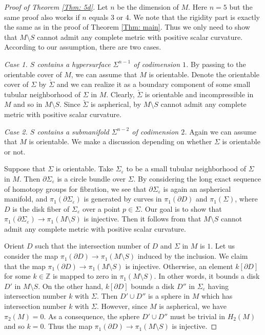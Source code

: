 \documentclass[11pt, reqno]{amsart}
\numberwithin{equation}{section}
\theoremstyle{definition}
\newcommand{\ve}{\varepsilon}
\begin{document}
\begin{proof}[Proof of Theorem \ref{Thm: 5d}]
Let $n$ be the dimension of $M$. Here $n =5$ but the same proof also works if $n$ equals 3 or 4. We note that the rigidity part is exactly the same as in the proof of Theorem \ref{Thm: main}. Thus we only need to show that $M\setminus S$ cannot admit any complete metric with positive scalar curvature. According to our assumption, there are two cases.

\medskip

{\it Case 1. $S$ contains a hypersurface $\Sigma^{n-1}$ of codimension $1$.}
By passing to the orientable cover of $M$, we can assume that $M$ is orientable. Denote the orientable cover of $\Sigma$ by $\check \Sigma$ and we can realize it as a boundary component of some small tubular neighborhood of $\Sigma$ in $M$. Clearly, $\check \Sigma$ is orientable and incompressible in $M$ and so in $M\setminus S$.
Since $\check\Sigma$ is aspherical, by \cite[Theorem 1.1]{CLSZ21} $M \setminus S$ cannot admit any complete metric with positive scalar curvature.

\medskip

{\it Case 2. $S$ contains a submanifold $\Sigma^{n-2}$ of codimension $2$.} Again we can assume that $M$ is orientable. We make a discussion depending on whether $\Sigma$ is orientable or not.

Suppose that $\Sigma$ is orientable.
Take $\Sigma_\ve$ to be a small tubular neighborhood of $\Sigma$ in $M$. Then $\partial \Sigma_\ve$ is a circle bundle over $\Sigma$. By considering the long exact sequence of homotopy groups for fibration, we see that $\partial \Sigma_\ve$ is again an aspherical manifold, and $\pi_1(\partial \Sigma_\ve)$ is generated by curves in $\pi_1(\partial D)$ and $\pi_1(\Sigma)$, where $D$ is the disk fiber of $\Sigma_\ve$ over a point $p \in \Sigma$.
Our goal is to show that $\pi_1(\partial \Sigma_\ve) \to \pi_1(M\setminus S)$ is injective.  Then it follows from \cite[Theorem 1.1]{CLSZ21} that $M \setminus S$ cannot admit any complete metric with positive scalar curvature.


Orient $D$ such that the intersection number of $D$ and $\Sigma$ in $M$ is $1$. Let us consider the map $\pi_1(\partial D) \to \pi_1(M\setminus S)$ induced by the inclusion. We claim that the map $\pi_1(\partial D) \to \pi_1(M\setminus S)$ is injective. Otherwise,
an element $k[\partial D]$ for some $k \in \mathbb{Z}$ is mapped to zero in $\pi_1(M\setminus S)$. In other words, it bounds a disk $D'$ in $M\setminus S$. On the other hand, $k[\partial D]$ bounds a disk $D''$ in $\Sigma_\ve$ having intersection number $k$ with $\Sigma$.
Then $D' \cup D''$ is a sphere in $M$ which has intersection number $k$ with $\Sigma$. However, since $M$ is aspherical, we have $\pi_2(M) =0$. As a consequence, the sphere $D'\cup D''$ must be trivial in $H_2(M)$ and so $k =0$. Thus the map $\pi_1(\partial D) \to \pi_1(M\setminus S)$ is injective.


\end{proof}
\end{document}
